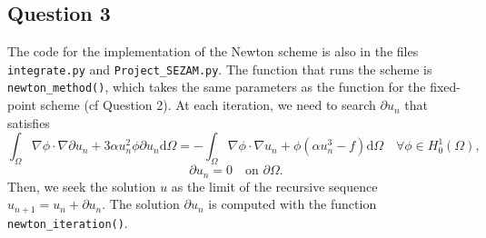 \documentclass[11pt, a4paper, twoside]{article}
\newcommand{\grad}{\nabla} %
\newcommand{\Hunz}{H^1_0(\Omega)}
\newcommand{\intom}{\int_\Omega}
\renewcommand{\d}{\text{d}}
\begin{document}
\subsection*{Question 3}
The code for the implementation of the Newton scheme is also in the files \verb+integrate.py+ and \verb+Project_SEZAM.py+. The function that runs the scheme is \verb+newton_method()+, which takes the same parameters as the function for the fixed-point scheme (cf Question 2).
At each iteration, we need to search $\partial u_n$ that satisfies 
$$\intom \grad \phi \cdot \grad \partial u_n + 3\alpha u_n^2 \phi \partial u_n \d\Omega = - \intom \grad \phi \cdot \grad u_n + \phi (\alpha u_n^3 - f) \d\Omega \quad \forall \phi\in \Hunz, $$
$$\partial u_n = 0 \quad \text{on } \partial\Omega.$$
Then, we seek the solution $u$ as the limit of the recursive sequence $u_{n+1} =u_n + \partial u_n$.
The solution $\partial u_n$ is computed with the function \verb+newton_iteration()+.
\end{document}
